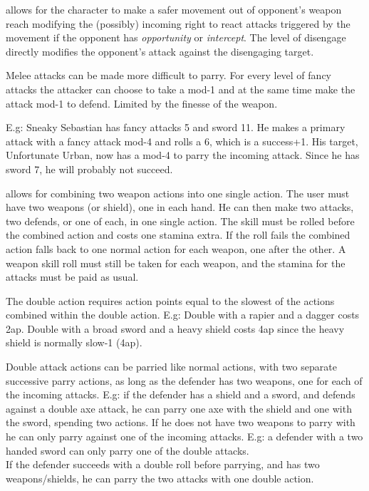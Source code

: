  allows for the character to make a safer movement out of opponent's weapon reach modifying the (possibly) incoming right to react attacks triggered by the movement if the opponent has \emph{opportunity} or \emph{intercept}. The level of disengage directly modifies the opponent's attack against the disengaging target.


 Melee attacks can be made more difficult to parry. For every level of fancy attacks the attacker can choose to take a mod-1 and at the same time make the attack mod-1 to defend. Limited by the finesse of the weapon.

E.g: Sneaky Sebastian has fancy attacks 5 and sword 11. He makes a primary attack with a fancy attack mod-4 and rolls a 6, which is a success+1. His target, Unfortunate Urban, now has a mod-4 to parry the incoming attack. Since he has sword 7, he will probably not succeed.


 allows for combining two weapon actions into one single action. The user must have two weapons (or shield), one in each hand. He can then make two attacks, two defends, or one of each, in one single action. The skill must be rolled before the combined action and costs one stamina extra. If the roll fails the combined action falls back to one normal action for each weapon, one after the other. A weapon skill roll must still be taken for each weapon, and the stamina for the attacks must be paid as usual.

The double action requires action points equal to the slowest of the actions combined within the double action. E.g: Double with a rapier and a dagger costs 2ap. Double with a broad sword and a heavy shield costs 4ap since the heavy shield is normally slow-1 (4ap).

Double attack actions can be parried like normal actions, with two separate successive parry actions, as long as the defender has two weapons, one for each of the incoming attacks. E.g: if the defender has a shield and a sword, and defends against a double axe attack, he can parry one axe with the shield and one with the sword, spending two actions. If he does not have two weapons to parry with he can only parry against one of the incoming attacks. E.g: a defender with a two handed sword can only parry one of the double attacks.\\
If the defender succeeds with a double roll before parrying, and has two weapons/shields, he can parry the two attacks with one double action.

